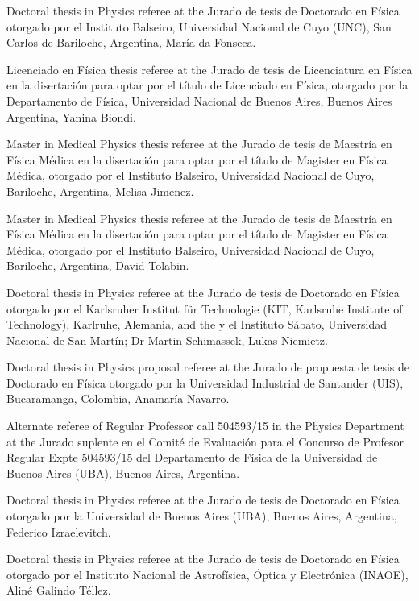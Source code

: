 \ifeng
Doctoral thesis in Physics referee at the 
\else
Jurado de tesis de Doctorado en Física otorgado por el
\fi
Instituto Balseiro, Universidad Nacional de Cuyo (UNC), San Carlos de Bariloche, Argentina, María da Fonseca.

\ifeng
Licenciado en Física thesis referee at the
\else
Jurado de tesis de Licenciatura en Física en la disertación para optar por el título de Licenciado en Física, otorgado por la 
\fi
Departamento de Física, Universidad Nacional de Buenos Aires, Buenos Aires Argentina, Yanina Biondi.

\ifeng
Master in Medical Physics thesis referee at the
\else
Jurado de tesis de Maestría en Física Médica en la disertación para optar por el título de Magister en Física Médica, otorgado por el 
\fi
Instituto Balseiro, Universidad Nacional de Cuyo, Bariloche, Argentina, Melisa Jimenez.

\ifeng
Master in Medical Physics thesis referee at the
\else
Jurado de tesis de Maestría en Física Médica en la disertación para optar por el título de Magister en Física Médica, otorgado por el 
\fi
Instituto Balseiro, Universidad Nacional de Cuyo, Bariloche, Argentina, David Tolabin.

\ifeng
Doctoral thesis in Physics referee at the 
\else
Jurado de tesis de Doctorado en Física otorgado por el 
\fi
Karlsruher Institut für Technologie (KIT, Karlsruhe Institute of Technology), Karlruhe, Alemania, \ifeng and the \else y el \fi Instituto Sábato, Universidad Nacional de San Martín; Dr Martin Schimassek, Lukas Niemietz.

\ifeng
Doctoral thesis in Physics proposal referee at the 
\else
Jurado de propuesta de tesis de Doctorado en Física otorgado por la 
\fi
Universidad Industrial de Santander (UIS), Bucaramanga, Colombia, Anamaría Navarro.

\ifeng
Alternate referee of Regular Professor call 504593/15 in the Physics Department at the  
\else
Jurado suplente en el Comité de Evaluación para el Concurso de Profesor Regular Expte 504593/15 del Departamento de Física de la 
\fi
Universidad de Buenos Aires (UBA), Buenos Aires, Argentina.

\ifeng
Doctoral thesis in Physics referee at the 
\else
Jurado de tesis de Doctorado en Física otorgado por la 
\fi
Universidad de Buenos Aires (UBA), Buenos Aires, Argentina, Federico Izraelevitch.

\ifeng
Doctoral thesis in Physics referee at the 
\else
Jurado de tesis de Doctorado en Física otorgado por el 
\fi
Instituto Nacional de Astrofísica, Óptica y Electrónica (INAOE), Aliné Galindo Téllez.

